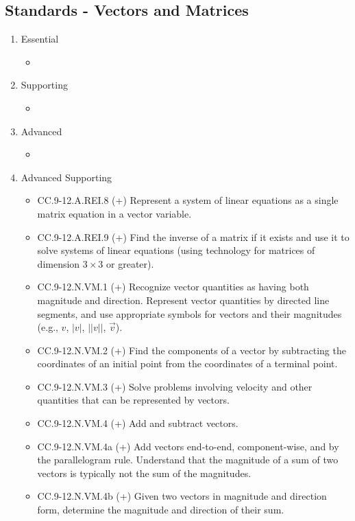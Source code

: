 \documentclass{article}
\begin{document}
\subsection*{Standards - Vectors and Matrices}
\begin{enumerate}
	\item Essential
	\begin{itemize}
		\item
	\end{itemize}		
	\item Supporting
	\begin{itemize}
		\item
	\end{itemize}
	\item Advanced
	\begin{itemize}
		\item
	\end{itemize}
	\item Advanced Supporting
	\begin{itemize}
		\item CC.9-12.A.REI.8 (+)  Represent a system of linear equations as a single matrix equation in a vector variable.
		\item CC.9-12.A.REI.9 (+)  Find the inverse of a matrix if it exists and use it to solve systems of linear equations (using technology for matrices of dimension $3 \times 3$ or greater).
		\item CC.9-12.N.VM.1 (+) Recognize vector quantities as having both magnitude and direction. Represent vector quantities by directed line segments, and use appropriate symbols for vectors and their magnitudes (e.g., \textbf{$v$}, $|$\textbf{$v$}$|$, $||$\textbf{$v$}$||$, $\vec{v}$).
		\item CC.9-12.N.VM.2 (+)  Find the components of a vector by subtracting the coordinates of an initial point from the coordinates of a terminal point.
		\item CC.9-12.N.VM.3 (+)   Solve problems involving velocity and other quantities that can be represented by vectors.
		\item CC.9-12.N.VM.4 (+)  Add and subtract vectors.
		\item CC.9-12.N.VM.4a (+) Add vectors end-to-end, component-wise, and by the parallelogram rule. Understand that the magnitude of a sum of two vectors is typically not the sum of the magnitudes.
		\item CC.9-12.N.VM.4b (+) Given two vectors in magnitude and direction form, determine the magnitude and direction of their sum. 

\end{itemize}
\end{enumerate}
\end{document}
